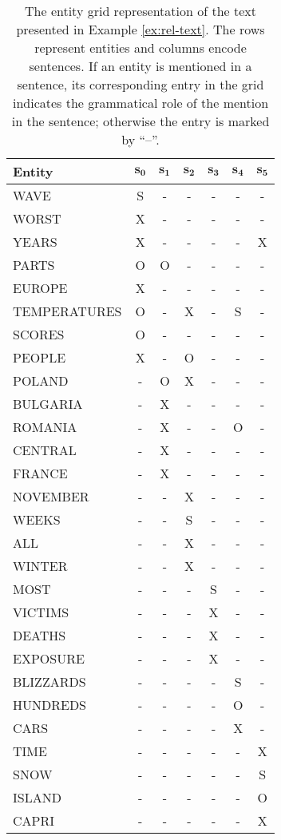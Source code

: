 \begin{table}[!ht]	
	\begin{center}
		\begin{tabular}{lcccccc}
			\toprule
			\textbf{Entity}  		& $\mathbf{s_0}$ & $\mathbf{s_1}$ & $\mathbf{s_2}$ & $\mathbf{s_3}$ & $\mathbf{s_4}$ & $\mathbf{s_5}$ 
			\\
			\midrule
			WAVE 			& S & - & - & - & - & - \\
			WORST 			& X & - & - & - & - & - \\
			YEARS 			& X & - & - & - & - & X \\
			PARTS 			& O & O & - & - & - & - \\
			EUROPE  		& X & - & - & - & - & - \\
			TEMPERATURES  	& O & - & X & - & S & - \\
			SCORES  		& O & - & - & - & - & - \\
			PEOPLE  		& X & - & O & - & - & - \\
			POLAND 			& - & O & X & - & - & - \\
			BULGARIA  		& - & X & - & - & - & - \\
			ROMANIA  		& - & X & - & - & O & - \\
			CENTRAL  		& - & X & - & - & - & - \\
			FRANCE  		& - & X & - & - & - & - \\
			NOVEMBER  		& - & - & X & - & - & - \\
			WEEKS 			& - & - & S & - & - & - \\
			ALL 			& - & - & X & - & - & - \\
			WINTER  		& - & - & X & - & - & - \\
			MOST 			& - & - & - & S & - & - \\
			VICTIMS  		& - & - & - & X & - & - \\
			DEATHS 			& - & - & - & X & - & - \\
			EXPOSURE  		& - & - & - & X & - & - \\
			BLIZZARDS  		& - & - & - & - & S & - \\
			HUNDREDS  		& - & - & - & - & O & - \\
			CARS  			& - & - & - & - & X & - \\
			TIME  			& - & - & - & - & - & X \\
			SNOW  			& - & - & - & - & - & S \\
			ISLAND 			& - & - & - & - & - & O \\
			CAPRI 			& - & - & - & - & - & X \\
			\bottomrule
		\end{tabular}
		\caption{
		The entity grid representation of the text presented in Example \ref{ex:rel-text}. The rows represent entities and columns encode sentences. 
        If an entity is mentioned in a sentence, its corresponding entry in the grid indicates the grammatical role of the mention in the sentence; otherwise the entry is marked by ``--''.
		} 
		\label{tab:rel-egrid}
	\end{center}
\end{table}

